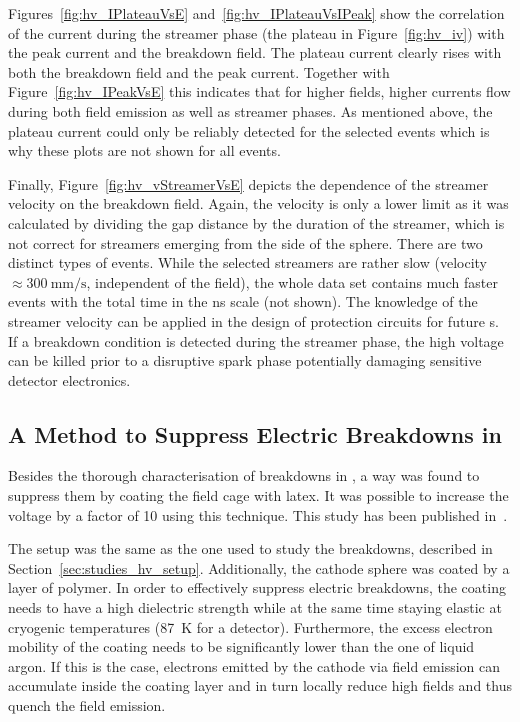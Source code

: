 Figures~\ref{fig:hv_IPlateauVsE} and~\ref{fig:hv_IPlateauVsIPeak} show the correlation of the current during the streamer phase (the plateau in Figure~\ref{fig:hv_iv}) with the peak current and the breakdown field.
The plateau current clearly rises with both the breakdown field and the peak current.
Together with Figure~\ref{fig:hv_IPeakVsE} this indicates that for higher fields, higher currents flow during both field emission as well as streamer phases.
As mentioned above, the plateau current could only be reliably detected for the selected events which is why these plots are not shown for all events.

Finally, Figure~\ref{fig:hv_vStreamerVsE} depicts the dependence of the streamer velocity on the breakdown field.
Again, the velocity is only a lower limit as it was calculated by dividing the gap distance by the duration of the streamer, which is not correct for streamers emerging from the side of the sphere.
There are two distinct types of events.
While the selected streamers are rather slow (velocity $\approx \SI{300}{\milli\metre\per\second}$, independent of the field), the whole data set contains much faster events with the total time in the ns scale (not shown).
The knowledge of the streamer velocity can be applied in the design of protection circuits for future \lartpc{}s.
If a breakdown condition is detected during the streamer phase, the high voltage can be killed prior to a disruptive spark phase potentially damaging sensitive detector electronics.


\subsection{A Method to Suppress Electric Breakdowns in }
\label{sec:studies_hv_latex}

Besides the thorough characterisation of breakdowns in \lar{}, a way was found to suppress them by coating the field cage with latex.
It was possible to increase the voltage by a factor of \num{10} using this technique.
This study has been published in~\cite{latex}.

The setup was the same as the one used to study the breakdowns, described in Section~\ref{sec:studies_hv_setup}.
Additionally, the cathode sphere was coated by a layer of polymer.
In order to effectively suppress electric breakdowns, the coating needs to have a high dielectric strength while at the same time staying elastic at cryogenic temperatures (\SI{87}{\kelvin} for a \lar{} detector).
Furthermore, the excess electron mobility of the coating needs to be significantly lower than the one of liquid argon.
If this is the case, electrons emitted by the cathode via field emission can accumulate inside the coating layer and in turn locally reduce high fields and thus quench the field emission.

